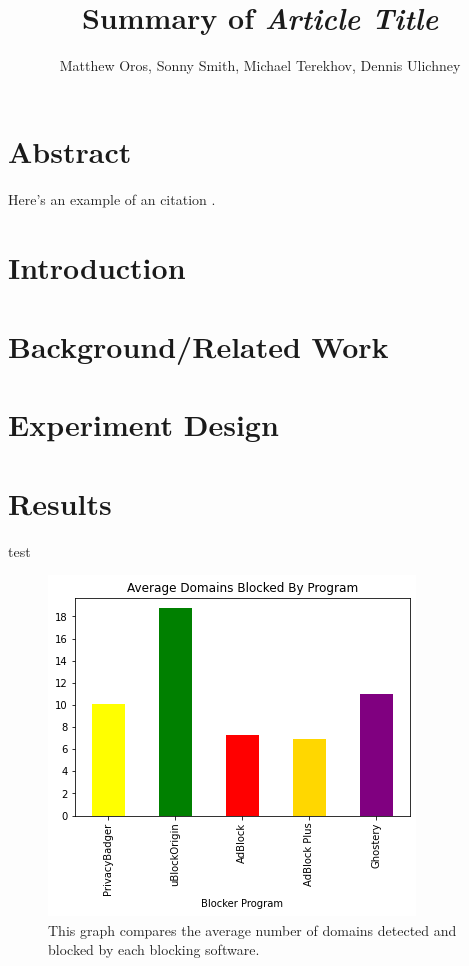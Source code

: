 \documentclass[sigsmall]{acmart}
\title{Summary of \emph{Article Title}}
\author{Matthew Oros, Sonny Smith, Michael Terekhov, Dennis Ulichney}
\begin{document}
\maketitle


\section*{Abstract}
Here's an example of an citation \cite{hopper:compilers101}.

\section*{Introduction}


\section*{Background/Related Work}


\section*{Experiment Design}

\section*{Results}

test

\begin{figure}
  \includegraphics[width=\linewidth]{AvgByProgram.png}
  \caption{This graph compares the average number of domains detected and blocked by each blocking software.}
  \label{fig:graph1}
\end{figure}
\end{document}
